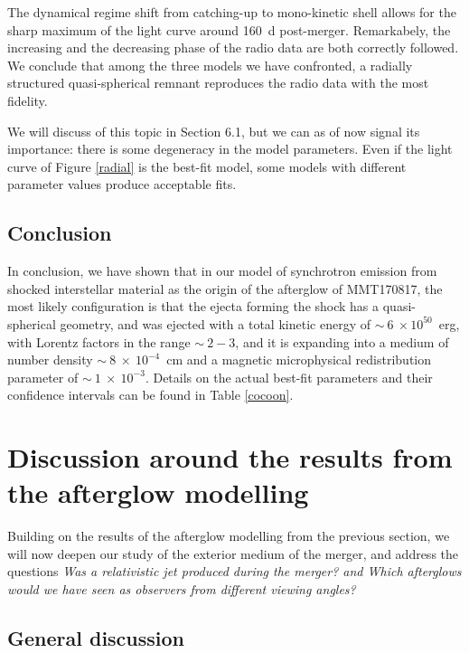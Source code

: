 
The dynamical regime shift from catching-up to mono-kinetic shell allows for the sharp maximum of the light curve around 160~d post-merger. Remarkabely, the increasing and the decreasing phase of the radio data are both correctly followed. We conclude that among the three models we have confronted, a radially structured quasi-spherical remnant reproduces the radio data with the most fidelity.

We will discuss of this topic in Section 6.1, but we can as of now signal its importance: there is some degeneracy in the model parameters. Even if the light curve of Figure \ref{radial} is the best-fit model, some models with different parameter values produce acceptable fits.


\subsection{Conclusion}

In conclusion, we have shown that in our model of synchrotron emission from shocked interstellar material as the origin of the afterglow of MMT170817, the most likely configuration is that the ejecta forming the shock has a quasi-spherical geometry, and was ejected with a total kinetic energy of $\sim~6~\times 10^{50}$~erg, with Lorentz factors in the range $\sim~2-3$, and it is expanding into a medium of number density $\sim~8~\times~10^{-4}$~cm and a magnetic microphysical redistribution parameter of $\sim~1~\times~10^{-3}$. Details on the actual best-fit parameters and their confidence intervals can be found in Table \ref{cocoon}.

\section{Discussion around the results from the afterglow modelling}

Building on the results of the afterglow modelling from the previous section, we will now deepen our study of the exterior medium of the merger, and address the questions \it{Was a relativistic jet produced during the merger?} and \it{Which afterglows would we have seen as observers from different viewing angles?}

\subsection{General discussion}

